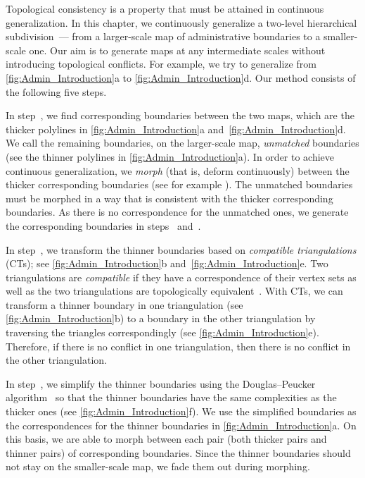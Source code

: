 Topological consistency is a property 
that must be attained in continuous generalization. 
In this chapter, we continuously generalize 
a two-level hierarchical subdivision~--- 
from a larger-scale map of administrative boundaries 
to a smaller-scale one.  
Our aim is to generate maps at any intermediate scales
without introducing topological conflicts.
For example, we try to generalize from
\fig\ref{fig:Admin_Introduction}a to
\fig\ref{fig:Admin_Introduction}d.
Our method consists of the following five steps.  

In step~, we find corresponding boundaries
between the two maps,
which are the thicker polylines in
\figs\ref{fig:Admin_Introduction}a 
and~\ref{fig:Admin_Introduction}d.  
We call the remaining boundaries, on the larger-scale map, 
\emph{unmatched} boundaries (see the
thinner polylines in \fig\ref{fig:Admin_Introduction}a). 
In order to achieve continuous generalization, 
we \emph{morph} (that is, deform continuously) 
between the thicker corresponding boundaries 
(see for example \textcite{Noellenburg2008}).
The unmatched boundaries must be morphed in a way 
that is consistent with the thicker corresponding boundaries.  
As there is no correspondence for the unmatched ones, 
we generate the corresponding boundaries 
in steps~ and~.

In step~, we transform the thinner boundaries 
based on \emph{compatible triangulations} (CTs); 
see \figs\ref{fig:Admin_Introduction}b 
and~\ref{fig:Admin_Introduction}e. 
Two triangulations are \emph{compatible} 
if they have a correspondence of their vertex sets as well as 
the two triangulations are topologically 
equivalent~\parencite{Surazhsky2001}. 
With CTs, 
we can transform a thinner boundary in one triangulation (see 
\fig\ref{fig:Admin_Introduction}b) 
to a boundary in the other triangulation 
by traversing the triangles correspondingly 
(see \fig\ref{fig:Admin_Introduction}e). 
Therefore, if there is no conflict in one triangulation, 
then there is no conflict in the other triangulation.
 

In step~, we simplify the thinner boundaries using
the Douglas--Peucker algorithm~\parencite{Douglas1973} 
so that the thinner boundaries 
have the same complexities as the thicker ones 
(see \fig\ref{fig:Admin_Introduction}f). 
We use the simplified boundaries as the correspondences for 
the thinner boundaries in \fig\ref{fig:Admin_Introduction}a. 
On this basis, we are able to morph between
each pair (both thicker pairs and thinner pairs) of 
corresponding boundaries.
Since the thinner boundaries should not stay
on the smaller-scale map, 
we fade them out during morphing. 


